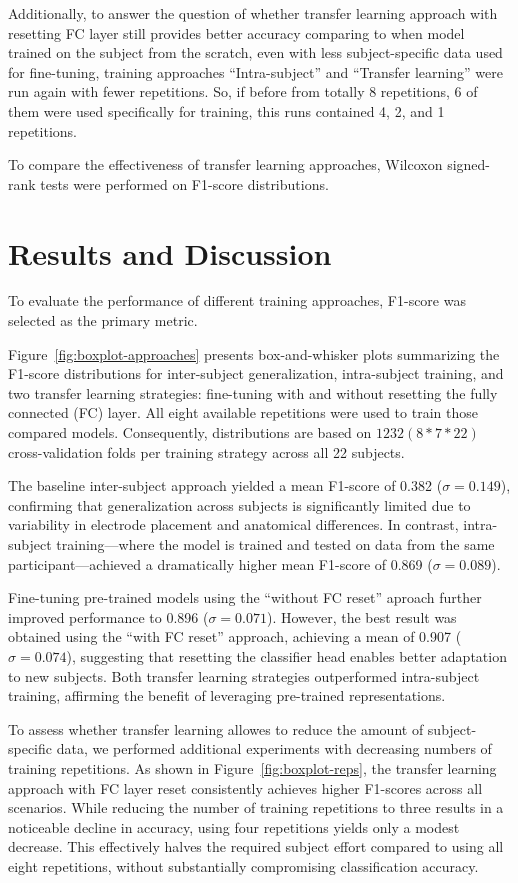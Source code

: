 Additionally, to answer the question of whether transfer learning approach with resetting FC layer still provides better accuracy comparing to when model trained on the subject from the scratch, even with less subject-specific data used for fine-tuning, training approaches ``Intra-subject'' and ``Transfer learning'' were run again with fewer repetitions. So, if before from totally 8 repetitions, 6 of them were used specifically for training, this runs contained 4, 2, and 1 repetitions.

To compare the effectiveness of transfer learning approaches, Wilcoxon signed-rank tests were performed on F1-score distributions.

\section{Results and Discussion}

To evaluate the performance of different training approaches, F1-score was selected as the primary metric.

Figure~\ref{fig:boxplot-approaches} presents box-and-whisker plots summarizing the F1-score distributions for inter-subject generalization, intra-subject training, and two transfer learning strategies: fine-tuning with and without resetting the fully connected (FC) layer. All eight available repetitions were used to train those compared models. Consequently, distributions are based on $1232 (8*7*22)$ cross-validation folds per training strategy across all 22 subjects.

The baseline inter-subject approach yielded a mean F1-score of 0.382 ($\sigma = 0.149$), confirming that generalization across subjects is significantly limited due to variability in electrode placement and anatomical differences. In contrast, intra-subject training—where the model is trained and tested on data from the same participant—achieved a dramatically higher mean F1-score of 0.869 ($\sigma = 0.089$).

Fine-tuning pre-trained models using the ``without FC reset'' aproach further improved performance to 0.896 ($\sigma = 0.071$). However, the best result was obtained using the ``with FC reset'' approach, achieving a mean of 0.907 ($\sigma = 0.074$), suggesting that resetting the classifier head enables better adaptation to new subjects. Both transfer learning strategies outperformed intra-subject training, affirming the benefit of leveraging pre-trained representations.

To assess whether transfer learning allowes to reduce the amount of subject-specific data, we performed additional experiments with decreasing numbers of training repetitions. As shown in Figure~\ref{fig:boxplot-reps}, the transfer learning approach with FC layer reset consistently achieves higher F1-scores across all scenarios. While reducing the number of training repetitions to three results in a noticeable decline in accuracy, using four repetitions yields only a modest decrease. This effectively halves the required subject effort compared to using all eight repetitions, without substantially compromising classification accuracy.

